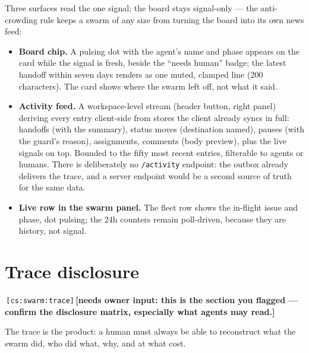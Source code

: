 \documentclass[11pt,a4paper]{report}
\newcommand{\cs}[1]{\,\texttt{\scriptsize[cs:#1]}\label{cs:#1}}
\newcommand{\owner}[1]{\,\textcolor{red!60!black}{\textbf{[needs owner input: #1]}}}
\begin{document}
Three surfaces read the one signal; the board stays signal-only --- the
anti-crowding rule keeps a swarm of any size from turning the board into
its own news feed:

\begin{itemize}
\item \textbf{Board chip.} A pulsing dot with the agent's name and phase
  appears on the card while the signal is fresh, beside the ``needs
  human'' badge; the latest handoff within seven days renders as one
  muted, clamped line (200 characters). The card shows where the swarm
  left off, not what it said.
\item \textbf{Activity feed.} A workspace-level stream (header button,
  right panel) deriving every entry client-side from stores the client
  already syncs in full: handoffs (with the summary), status moves
  (destination named), pauses (with the guard's reason), assignments,
  comments (body preview), plus the live signals on top. Bounded to the
  fifty most recent entries, filterable to agents or humans. There is
  deliberately no \texttt{/activity} endpoint: the outbox already
  delivers the trace, and a server endpoint would be a second source of
  truth for the same data.
\item \textbf{Live row in the swarm panel.} The fleet row shows the
  in-flight issue and phase, dot pulsing; the 24h counters remain
  poll-driven, because they are history, not signal.
\end{itemize}

\section{Trace disclosure}
\cs{swarm:trace}\owner{this is the section you flagged --- confirm the
  disclosure matrix, especially what agents may read.}

The trace is the product: a human must always be able to reconstruct
what the swarm did, who did what, why, and at what cost.
\end{document}
